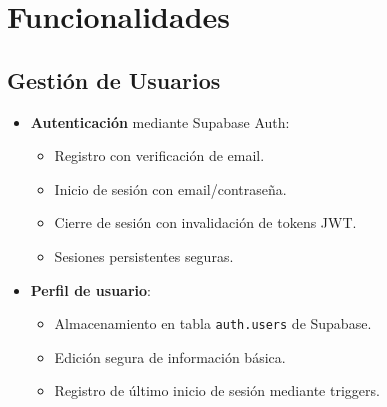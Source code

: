 \section{Funcionalidades}
\subsection*{Gestión de Usuarios}
\begin{itemize}
    \item \textbf{Autenticación} mediante Supabase Auth:
    \begin{itemize}
        \item Registro con verificación de email.
        \item Inicio de sesión con email/contraseña.
        \item Cierre de sesión con invalidación de tokens JWT.
        \item Sesiones persistentes seguras.
    \end{itemize}
    
    \item \textbf{Perfil de usuario}:
    \begin{itemize}
        \item Almacenamiento en tabla \texttt{auth.users} de Supabase.
        \item Edición segura de información básica.
        \item Registro de último inicio de sesión mediante triggers.
    \end{itemize}
\end{itemize}

